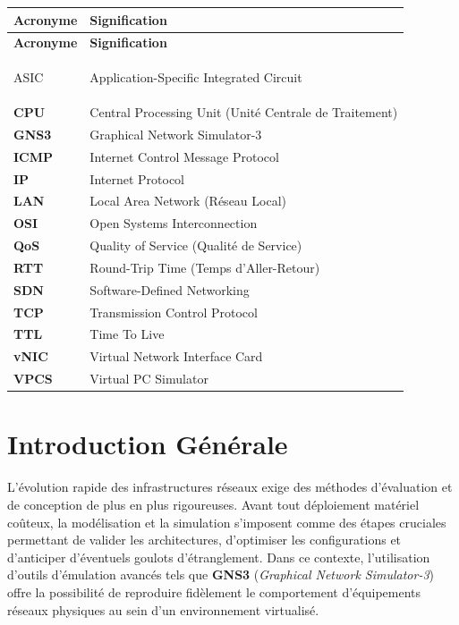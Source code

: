 \documentclass[11pt,a4paper,oneside]{report}
\begin{document}
\begin{longtable}{>{\bfseries\color{accentblue}}l p{12cm}}
\rowcolor{univblue!10}
\textbf{Acronyme} & \textbf{Signification} \\ \midrule
\endfirsthead
\rowcolor{univblue!10}
\textbf{Acronyme} & \textbf{Signification} \\ \midrule
\endhead

ASIC & Application-Specific Integrated Circuit \\
CPU & Central Processing Unit (Unité Centrale de Traitement) \\
GNS3 & Graphical Network Simulator-3 \\
ICMP & Internet Control Message Protocol \\
IP & Internet Protocol \\
LAN & Local Area Network (Réseau Local) \\
OSI & Open Systems Interconnection \\
QoS & Quality of Service (Qualité de Service) \\
RTT & Round-Trip Time (Temps d'Aller-Retour) \\
SDN & Software-Defined Networking \\
TCP & Transmission Control Protocol \\
TTL & Time To Live \\
vNIC & Virtual Network Interface Card \\
VPCS & Virtual PC Simulator \\
\bottomrule
\end{longtable}

\chapter*{Introduction G\'{e}n\'{e}rale}

L'\'{e}volution rapide des infrastructures r\'{e}seaux exige des m\'{e}thodes d'\'{e}valuation et de conception de plus en plus rigoureuses. Avant tout d\'{e}ploiement mat\'{e}riel co\^{u}teux, la mod\'{e}lisation et la simulation s'imposent comme des \'{e}tapes cruciales permettant de valider les architectures, d'optimiser les configurations et d'anticiper d'\'{e}ventuels goulots d'\'{e}tranglement. Dans ce contexte, l'utilisation d'outils d'\'{e}mulation avanc\'{e}s tels que \textbf{GNS3} (\textit{Graphical Network Simulator-3}) offre la possibilit\'{e} de reproduire fid\`{e}lement le comportement d'\'{e}quipements r\'{e}seaux physiques au sein d'un environnement virtualis\'{e}.~\cite{gns32026}
\end{document}
